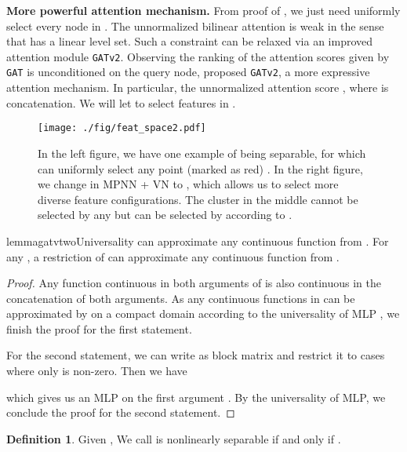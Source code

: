 \documentclass[nohyperref]{article}
\theoremstyle{plain}
\theoremstyle{definition}
\newtheorem{definition}[theorem]{Definition}
\theoremstyle{remark}
\newcommand{\gatii}{\texttt{GATv2}\xspace}
\begin{document}
\textbf{More powerful attention mechanism.} From proof of , we just need  uniformly select every node in . The unnormalized bilinear attention  is weak in the sense that  has a linear level set. Such a constraint can be relaxed via an improved attention module \gatii. Observing the ranking of the attention scores given by \texttt{GAT} \citep{velivckovic2017graph} is unconditioned on the query node, \citet{brody2021attentive} proposed \gatii, a more expressive attention mechanism. 
In particular, the unnormalized attention score , where  is concatenation. We will let  to select features in . 

\begin{figure}[hbtp]
  \centering
  \texttt{[image: ./fig/feat\_space2.pdf]}
\caption{In the left figure, we have one example of  being  separable, for which  can uniformly select any point (marked as red) . In the right figure, we change  in MPNN + VN to , which allows us to select more diverse feature configurations. The cluster in the middle cannot be selected by any  but can be selected by  according to . }
\label{fig:convergence}
\end{figure}


\begin{restatable}{lemma}{gatvtwoUniversality}
\label{lemma-gatv2-universality}
 can approximate any continuous function from . For any , a restriction of  can approximate any continuous function from .
\end{restatable}
\begin{proof}
Any function continuous in both arguments of  is also continuous in the concatenation of both arguments. As any continuous functions in  can be approximated by   on a compact domain according to the universality of MLP \citep{cybenko1989approximation}, we finish the proof for the first statement.

For the second statement, we can write  as  block matrix and restrict it to cases where only  is non-zero. Then we have 
 
  which gives us an MLP on the first argument . By the universality of MLP, we conclude the proof for the second statement. 

\end{proof}


\begin{definition}
\label{delta-sepration}
Given , We call  is  nonlinearly separable if and only if . 
\end{definition}
\end{document}
